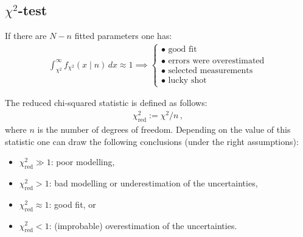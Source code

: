 
\subsection{\texorpdfstring{$\chi^2$}{Chi squared}-test}\label{section:chi_squared_test}

    \begin{property}\label{statistics:chi_square}
        If there are $N - n$ fitted parameters one has:
        \begin{gather}
            \int_{\chi^2}^\infty f_{\chi^2}(x\mid n)\,dx\approx 1\implies
            \begin{cases}
                \bullet\text{ good fit}\\
                \bullet\text{ errors were overestimated}\\
                \bullet\text{ selected measurements}\\
                \bullet\text{ lucky shot}
            \end{cases}
        \end{gather}
    \end{property}
    \begin{property}
        The reduced chi-squared statistic is defined as follows:
        \begin{gather}
            \chi^2_\text{red} := \chi^2/n\,,
        \end{gather}
        where $n$ is the number of degrees of freedom. Depending on the value of this statistic one can draw the following conclusions (under the right assumptions):
        \begin{itemize}
            \item $\chi^2_\text{red}\gg1$: poor modelling,
            \item $\chi^2_\text{red}>1$: bad modelling or underestimation of the uncertainties,
            \item $\chi^2_\text{red}\approx1$: good fit, or
            \item $\chi^2_\text{red}<1$: (improbable) overestimation of the uncertainties.
        \end{itemize}
    \end{property}

